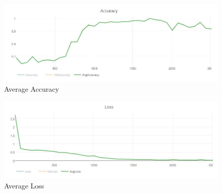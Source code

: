         \begin{figure}[htbp]
	    \centering
		\includegraphics[scale=0.5]{Figures/avgAccuracy(him).JPG}
	    \caption[Average Accuracy]{Average Accuracy}
	    \label{fig:avgacc}
        \end{figure}
        
        \begin{figure}[htbp]
	    \centering
		\includegraphics[scale=0.5]{Figures/avgLoss(him).JPG}
	    \caption[Average Loss]{Average Loss}
	    \label{fig:avgloss}
        \end{figure}
